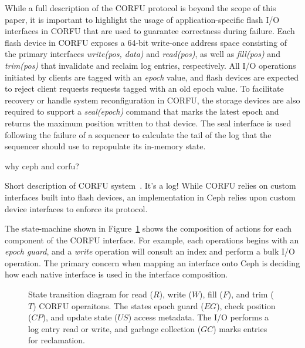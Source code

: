 \documentclass[10pt,twocolumn]{article}
\begin{document}
While a full description of the CORFU protocol is beyond the scope of this
paper, it is important to highlight the usage of application-specific flash
I/O interfaces in CORFU that are used to guarantee correctness during failure.
Each flash device in CORFU exposes a 64-bit write-once address space
consisting of the primary interfaces \emph{write(pos, data)} and
\emph{read(pos)}, as well as \emph{fill(pos)} and \emph{trim(pos)} that
invalidate and reclaim log entries, respectively. All I/O operations initiated
by clients are tagged with an \emph{epoch} value, and flash devices are
expected to reject client requests requests tagged with an old epoch value. To
facilitate recovery or handle system reconfiguration in CORFU, the storage
devices are also required to support a \emph{seal(epoch)} command that marks
the latest epoch and returns the maximum position written to that device. The
seal interface is used following the failure of a sequencer to calculate the
tail of the log that the sequencer should use to repopulate its in-memory
state.

why ceph and corfu?


Short description of CORFU system~\cite{balakrishnan:nsdi12}. It's a log!
While CORFU relies on custom interfaces built into flash devices, an
implementation in Ceph relies upon custom device interfaces to enforce its
protocol.

The state-machine shown in Figure~\ref{fig:corfu-sm} shows the composition of
actions for each component of the CORFU interface. For example, each
operations begins with an \emph{epoch guard}, and a \emph{write} operation
will consult an index and perform a bulk I/O operation.  The primary concern
when mapping an interface onto Ceph is deciding how each native interface is
used in the interface composition.

\begin{figure}
\centering
{}
\caption{State transition diagram for read ($R$), write ($W$), fill ($F$), and
trim ($T$) CORFU operaitons. The states epoch guard ($EG$), check position ($CP$),
and update state ($US$) access metadata. The I/O performs a log entry read or
write, and garbage collection ($GC$) marks entries for reclamation.}
\label{fig:corfu-sm}
\end{figure}
\end{document}
